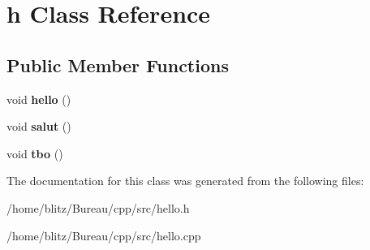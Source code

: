 \hypertarget{classh}{}\section{h Class Reference}
\label{classh}
\subsection*{Public Member Functions}
\begin{DoxyCompactItemize}
\item 
\mbox{\label{classh_a08389a5808dbcc41599a13ccc5b73d80}} 
void {\bfseries hello} ()
\item 
\mbox{\label{classh_ab851fb2fa5d6e8fcc2aa23ba174ed2a9}} 
void {\bfseries salut} ()
\item 
\mbox{\label{classh_a4b9495b8b399d4111ed4f1da9a32a704}} 
void {\bfseries tbo} ()
\end{DoxyCompactItemize}


The documentation for this class was generated from the following files\+:\begin{DoxyCompactItemize}
\item 
/home/blitz/\+Bureau/cpp/src/hello.\+h\item 
/home/blitz/\+Bureau/cpp/src/hello.\+cpp\end{DoxyCompactItemize}
